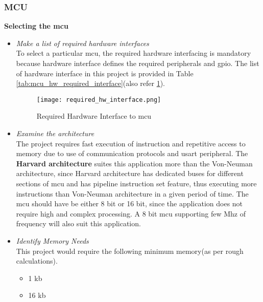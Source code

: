 
\subsubsection{MCU}
     \textbf{Selecting the \gls{mcu}}
	
	\begin{itemize}
		\item [Step 1:]\emph{ Make a list of required hardware interfaces}\\
		To select a particular \gls{mcu}, the required hardware interfacing is mandatory because hardware interface defines the required peripherals and \gls{gpio}. The list of hardware interface in this project is provided in Table   \ref{tab:mcu_hw_required_interface}(also refer \ref{img:required_hw_interface_mcu}).
		
	\begin{figure}[H]
		\caption{Required Hardware Interface to \gls{mcu}}
		\texttt{[image: required\_hw\_interface.png]}
		\label{img:required_hw_interface_mcu}
	\end{figure}
	
		\item [Step 2:] \emph{Examine the architecture}\\	
		The project requires fast execution of instruction  and repetitive access to memory due to use of communication protocols and \gls{usart} peripheral. The \textbf{Harvard architecture} suites this application more than the Von-Neuman architecture, since Harvard architecture has dedicated buses for different sections of \gls{mcu} and has pipeline instruction set feature, thus executing  more instructions than Von-Neuman  architecture in a given period of time. 
		The \gls{mcu} should have be either 8 bit or 16 bit, since the application does not require high and complex processing. A 8 bit \gls{mcu} supporting few Mhz of frequency will also suit this application.
		
		\item[Step 3:] \emph{Identify Memory Needs}\\
		This project would require the following minimum memory(as per rough calculations).
			\begin{itemize}
				\item[\acrshort{eeprom} :] 1 \acrshort{kb}
				
				\item[Flash :] 16 \acrshort{kb}
				

\end{itemize}
\end{itemize}
